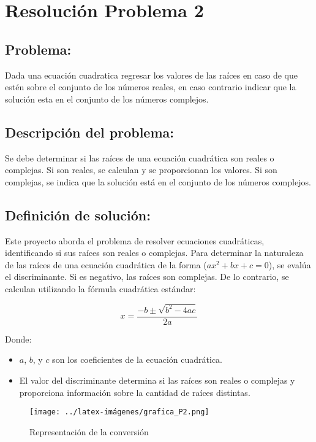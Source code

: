 \section{Resolución Problema 2} 
\subsection{Problema:}
Dada una ecuación cuadratica regresar los valores de las raíces en caso de que estén sobre el conjunto de los números reales, en caso contrario indicar que la solución esta en el conjunto de los números complejos. 

\subsection{\textbf{Descripción del problema:}}
Se debe determinar si las raíces de una ecuación cuadrática 
son reales o complejas. Si son reales, se calculan y 
se proporcionan los valores. Si son complejas, se 
indica que la solución está en el conjunto de los números complejos.

\subsection{\textbf{Definición de solución:}}
Este proyecto aborda el problema de resolver ecuaciones cuadráticas, identificando si sus raíces son reales o complejas. 
Para determinar la naturaleza de las raíces de una ecuación cuadrática de la forma  (\(ax^2 + bx + c = 0\)), se evalúa el discriminante. Si es negativo, las raíces son complejas. De lo contrario, se calculan utilizando la fórmula cuadrática estándar:

\[ x = \frac{-b \pm \sqrt{b^2 - 4ac}}{2a} \]

Donde:
\begin{itemize}
    \item \(a\), \(b\), y \(c\) son los coeficientes de la ecuación cuadrática.
    \item El valor del discriminante determina si las raíces son reales o complejas y proporciona información sobre la cantidad de raíces distintas.
\end{itemize}


\begin{figure}[h!]
    \centering
    \texttt{[image: ../latex-imágenes/grafica\_P2.png]}
    \caption{Representación de la conversión}
    \label{fig: Grafica Ecuacion Recta}
\end{figure}

